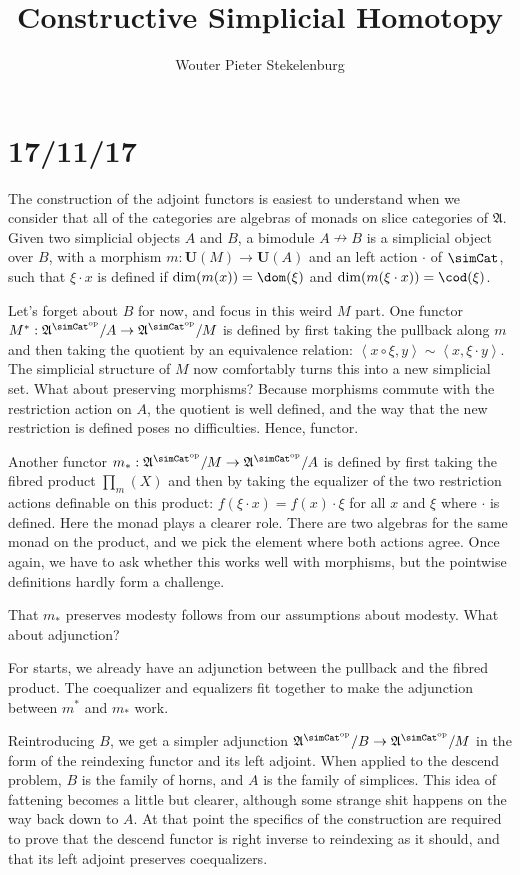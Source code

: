 \documentclass{tac}
\title{Constructive Simplicial Homotopy}
\author{Wouter Pieter Stekelenburg}
\newcommand\ri{^*}
\newcommand\dual{^{\mathrm{op}}}
\newcommand\s{^{\simCat\dual}}
\newcommand\of{:}
\newcommand\tuplet[1]{\left\langle #1 \right\rangle}
\newcommand\base{\mathbf{U}}
\newcommand\ambient{\mathfrak A}
\begin{document}
\section{17/11/17}
The construction of the adjoint functors is easiest to understand when we consider that all of the categories are algebras of monads on slice categories of $\ambient$. Given two simplicial objects $A$ and $B$, a bimodule $A\nrightarrow B$ is a simplicial object over $B$, with a morphism $m\of\base(M)\to \base(A)$ and an left action $\cdot$ of $\simCat$, such that $\xi\cdot x$ is defined if $\dim(m(x)) = \dom(\xi)$ and $\dim(m(\xi\cdot x)) = \cod(\xi)$.

Let's forget about $B$ for now, and focus in this weird $M$ part. One functor $M\ri\of \ambient\s/A\to\ambient\s/M$ is defined by first taking the pullback along $m$ and then taking the quotient by an equivalence relation: $\tuplet{x\circ \xi , y}\sim\tuplet{x,\xi\cdot y}$. The simplicial structure of $M$ now comfortably turns this into a new simplicial set. What about preserving morphisms? Because morphisms commute with the restriction action on $A$, the quotient is well defined, and the way that the new restriction is defined poses no difficulties. Hence, functor.

Another functor $m_*\of\ambient\s/M\to \ambient\s/A$ is defined by first taking the fibred product $\prod_m(X)$ and then by taking the equalizer of the two restriction actions definable on this product: $f(\xi\cdot x) = f(x)\cdot \xi$ for all $x$ and $\xi$ where $\cdot$ is defined. Here the monad plays a clearer role. There are two algebras for the same monad on the product, and we pick the element where both actions agree.
Once again, we have to ask whether this works well with morphisms, but the pointwise definitions hardly form a challenge.

That $m_*$ preserves modesty follows from our assumptions about modesty. What about adjunction?

For starts, we already have an adjunction between the pullback and the fibred product. The coequalizer and equalizers fit together to make the adjunction between $m\ri$ and $m_*$ work.

Reintroducing $B$, we get a simpler adjunction $\ambient\s/B\to \ambient\s/M$ in the form of the reindexing functor and its left adjoint. When applied to the descend problem, $B$ is the family of horns, and $A$ is the family of simplices. This idea of fattening becomes a little but clearer, although some strange shit happens on the way back down to $A$. At that point the specifics of the construction are required to prove that the descend functor is right inverse to reindexing as it should, and that its left adjoint preserves coequalizers.
\end{document}
